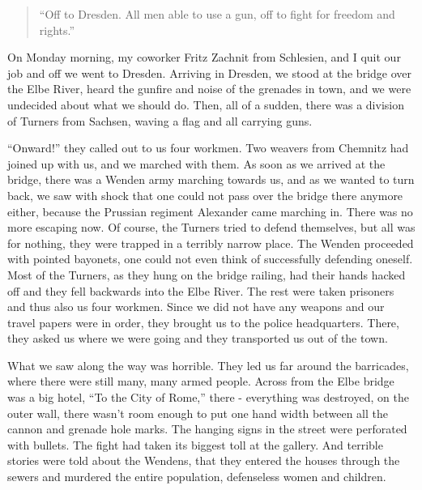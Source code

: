 \documentclass{article}
\begin{document}
\begin{quote}
``Off to Dresden. All men able to use a gun, off to fight for freedom and rights.''
\end{quote}

On Monday morning, my coworker Fritz Zachnit from Schlesien, and I quit our job and off we went to Dresden. Arriving in Dresden, we stood at the bridge over the Elbe River, heard the gunfire and noise of the grenades in town, and we were undecided about what we should do. Then, all of a sudden, there was a division of Turners from Sachsen, waving a flag and all carrying guns.

``Onward!'' they called out to us four workmen. Two weavers from Chemnitz had joined up with us, and we marched with them. As soon as we arrived at the bridge, there was a Wenden army marching towards us, and as we wanted to turn back, we saw with shock that one could not pass over the bridge there anymore either, because the Prussian regiment Alexander came marching in. There was no more escaping now. Of course, the Turners tried to defend themselves, but all was for nothing, they were trapped in a terribly narrow place. The Wenden proceeded with pointed bayonets, one could not even think of successfully defending oneself. Most of the Turners, as they hung on the bridge railing, had their hands hacked off and they fell backwards into the Elbe River. The rest were taken prisoners and thus also us four workmen. Since we did not have any weapons and our travel papers were in order, they brought us to the police headquarters. There, they asked us where we were going and they transported us out of the town.

What we saw along the way was horrible. They led us far around the barricades, where there were still many, many armed people. Across from the Elbe bridge was a big hotel, ``To the City of Rome,'' there - everything was destroyed, on the outer wall, there wasn't room enough to put one hand width between all the cannon and grenade hole marks. The hanging signs in the street were perforated with bullets. The fight had taken its biggest toll at the gallery. And terrible stories were told about the Wendens, that they entered the houses through the sewers and murdered the entire population, defenseless women and children.
\end{document}
